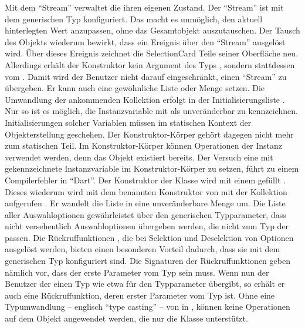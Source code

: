 Mit dem \enquote{Stream}  verwaltet die  ihren eigenen Zustand.
Der \enquote{Stream} ist mit dem generischen Typ  konfiguriert.
Das macht es unmöglich, den aktuell hinterlegten Wert anzupassen, ohne das Gesamtobjekt auszutauschen.
Der Tausch des Objekts wiederum bewirkt, dass ein Ereignis über den \enquote{Stream} ausgelöst wird. Über dieses Ereignis zeichnet die SelectionCard Teile seiner Oberfläche neu.
Allerdings erhält der Konstruktor kein Argument des Typs , sondern stattdessen vom  .
Damit wird der Benutzer nicht darauf eingeschränkt, einen \enquote{Stream} zu übergeben.
Er kann auch eine gewöhnliche Liste oder Menge setzen.
Die Umwandlung der ankommenden Kollektion erfolgt in der Initialisierungsliste .
Nur so ist es möglich, die Instanzvariable mit  als unveränderbar zu kennzeichnen.
Initialisierungen solcher Variablen müssen im statischen Kontext der Objekterstellung geschehen.
Der Konstruktor-Körper gehört dagegen nicht mehr zum statischen Teil.
Im Konstruktor-Körper können Operationen der Instanz verwendet werden, denn das Objekt existiert bereits.
Der Versuch eine mit  gekennzeichnete Instanzvariable im Konstruktor-Körper zu setzen, führt zu einem Compilerfehler in \enquote{Dart}.
Der Konstruktor  der Klasse  wird mit einem  gefüllt .
Dieses wiederum wird mit dem benannten Konstruktor  von  mit der Kollektion aufgerufen .
Er wandelt die  Liste in eine unveränderbare Menge um.
Die Liste aller Auswahloptionen   gewährleistet über den generischen Typparameter, dass nicht versehentlich Auswahloptionen übergeben werden, die nicht zum Typ der  passen.
Die Rückruffunktionen , die bei Selektion und Deselektion von Optionen ausgelöst werden, bieten einen besonderen Vorteil dadurch, dass sie mit dem generischen Typ konfiguriert sind.
Die Signaturen der Rückruffunktionen  geben nämlich vor, dass der erste Parameter vom Typ  sein muss.
Wenn nun der Benutzer der  einen Typ wie etwa  für den Typparameter übergibt, so erhält er auch eine Rückruffunktion, deren erster Parameter vom Typ  ist.
Ohne eine Typumwandlung -- englisch \enquote{type casting} -- von  in , können keine Operationen auf dem Objekt angewendet werden, die nur die Klasse  unterstützt.

